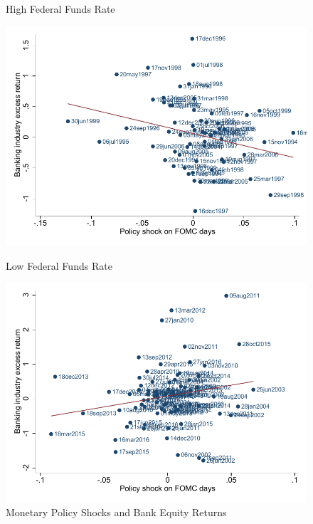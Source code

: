 \documentclass[12pt]{article}
\begin{document}
\newpage
\begin{figure}[h]
	\begin{centering}
		High Federal Funds Rate
		\par\end{centering}
	\begin{centering}
		\includegraphics[scale=0.8]{../output/Figures/bank_karadi_above}
		\par\end{centering}
	\vspace{5mm}
	\begin{centering}
		Low Federal Funds Rate
		\par
		\includegraphics[scale=0.8]{../output/Figures/bank_karadi_below}
		\caption{Monetary Policy Shocks and Bank Equity Returns\label{fig:stock_return}}

\end{centering}
\end{figure}
\end{document}
